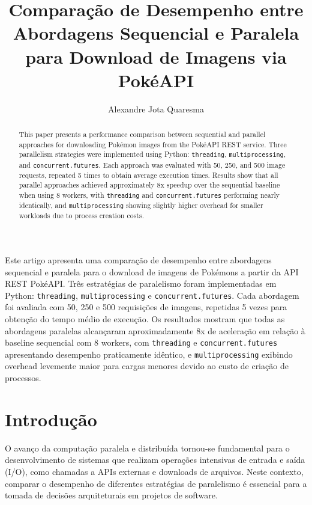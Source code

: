 \documentclass[12pt]{article}
\title{Comparação de Desempenho entre Abordagens Sequencial e Paralela\\
  para Download de Imagens via PokéAPI}
\author{Alexandre Jota Quaresma}
\begin{document}
\maketitle

\begin{abstract}
  This paper presents a performance comparison between sequential and parallel
  approaches for downloading Pokémon images from the PokéAPI REST service.
  Three parallelism strategies were implemented using Python: \texttt{threading},
  \texttt{multiprocessing}, and \texttt{concurrent.futures}. Each approach was
  evaluated with 50, 250, and 500 image requests, repeated 5 times to obtain
  average execution times. Results show that all parallel approaches achieved
  approximately 8x speedup over the sequential baseline when using 8
  workers, with \texttt{threading} and \texttt{concurrent.futures} performing
  nearly identically, and \texttt{multiprocessing} showing slightly higher
  overhead for smaller workloads due to process creation costs.
\end{abstract}

\begin{resumo}
  Este artigo apresenta uma comparação de desempenho entre abordagens sequencial
  e paralela para o download de imagens de Pokémons a partir da API REST PokéAPI.
  Três estratégias de paralelismo foram implementadas em Python: \texttt{threading},
  \texttt{multiprocessing} e \texttt{concurrent.futures}. Cada abordagem foi
  avaliada com 50, 250 e 500 requisições de imagens, repetidas 5 vezes para
  obtenção do tempo médio de execução. Os resultados mostram que todas as
  abordagens paralelas alcançaram aproximadamente 8x de aceleração em relação à
  baseline sequencial com 8 workers, com \texttt{threading} e
  \texttt{concurrent.futures} apresentando desempenho praticamente idêntico, e
  \texttt{multiprocessing} exibindo overhead levemente maior para cargas menores
  devido ao custo de criação de processos.
\end{resumo}


\section{Introdução}

O avanço da computação paralela e distribuída tornou-se fundamental para o
desenvolvimento de sistemas que realizam operações intensivas de entrada e saída
(I/O), como chamadas a APIs externas e downloads de arquivos. Neste contexto,
comparar o desempenho de diferentes estratégias de paralelismo é essencial para
a tomada de decisões arquiteturais em projetos de software.
\end{document}
